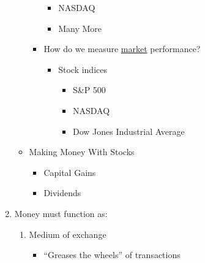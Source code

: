 \documentclass[12pt]{article}
\begin{document}
\begin{enumerate}
\begin{itemize}
\begin{itemize}
\begin{itemize}
              \item NASDAQ

              \item Many More

            \end{itemize}

          \item How do we measure \underline{market} performance?

            \begin{itemize}

              \item Stock indices

                \begin{itemize}

                  \item S\&P 500

                  \item NASDAQ

                  \item Dow Jones Industrial Average

                \end{itemize}

            \end{itemize}

        \end{itemize}

      \item Making Money With Stocks

        \begin{itemize}

          \item Capital Gains

          \item Dividends

        \end{itemize}

    \end{itemize}

  \item Money must function as:

    \begin{enumerate}

      \item Medium of exchange

        \begin{itemize}

          \item “Greases the wheels” of transactions


\end{itemize}
\end{enumerate}
\end{enumerate}
\end{document}
